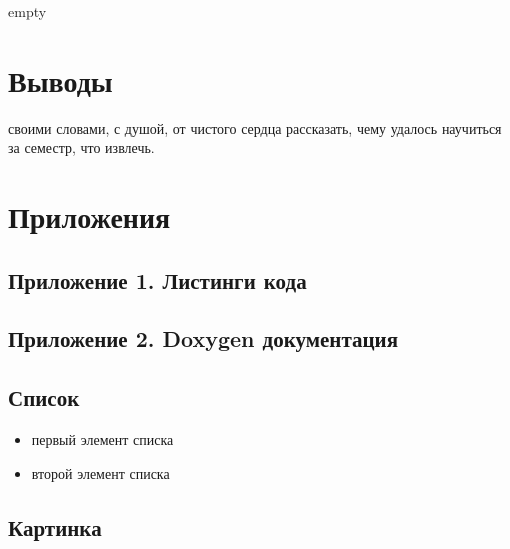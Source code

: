 
empty

\section*{Выводы}

своими словами, с душой, от чистого сердца рассказать, чему удалось научиться за семестр, что извлечь.


\section*{Приложения}

\subsection*{Приложение 1. Листинги кода}


\subsection*{Приложение 2. Doxygen документация}

\subsection*{Список}

\begin{itemize}
\item первый элемент списка
\item второй элемент списка
\end{itemize}


\subsection*{Картинка}

